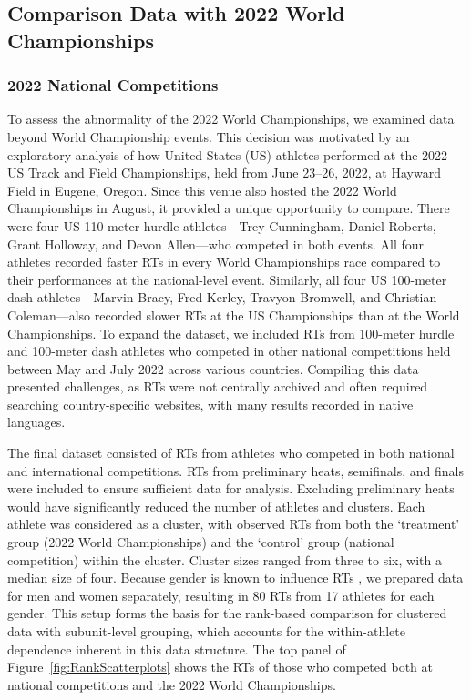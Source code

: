 \documentclass[12pt, letterpaper]{article}
\begin{document}
\subsection{Comparison Data with 2022 World Championships}
\label{sec:databeyond}



\subsubsection{2022 National Competitions}
\label{sec:datanational}

To assess the abnormality of the 2022 World Championships, we examined
data beyond World Championship events. This decision was motivated by
an exploratory analysis of how United States (US) athletes performed
at the 2022 US Track and Field Championships, held from June 23--26,
2022, at Hayward Field in Eugene, Oregon. Since this venue also hosted
the 2022 World Championships in August, it
provided a unique opportunity to compare. There were four US
110-meter hurdle athletes—Trey Cunningham, Daniel Roberts,
Grant Holloway, and Devon Allen—who competed in both events. All four
athletes recorded faster RTs in every World Championships race
compared to their performances at the national-level event. Similarly,
all four US 100-meter dash athletes---Marvin Bracy, Fred Kerley,
Travyon Bromwell, and Christian Coleman---also recorded slower RTs at
the US Championships than at the World Championships.
To expand the dataset, we included RTs from 100-meter hurdle
and 100-meter dash athletes who competed in other national
competitions held between May and July 2022 across various
countries. Compiling this data presented challenges, as RTs were not
centrally archived and often required searching country-specific
websites, with many results recorded in native languages.


The final dataset consisted of RTs from athletes who competed
in both national and international competitions. RTs from
preliminary heats, semifinals, and finals were included to ensure
sufficient data for analysis. Excluding preliminary heats would have
significantly reduced the number of athletes and clusters. Each
athlete was considered as a cluster, with observed RTs
from both the `treatment' group (2022 World Championships) and
the `control' group (national competition) within the cluster. Cluster
sizes ranged from three to six, with a median size of four. Because gender
is known to influence RTs \citep{babicc2009reaction,
  lipps2011implications}, we prepared data for men and women
separately, resulting in 80 RTs from 17 athletes for each
gender. This setup forms the basis for the rank-based comparison for
clustered data with subunit-level grouping, which accounts for the
within-athlete dependence inherent in this data structure. The top
panel of Figure~\ref{fig:RankScatterplots} shows the RTs
of those who competed both at national competitions and the 2022 World
Championships.
\end{document}
